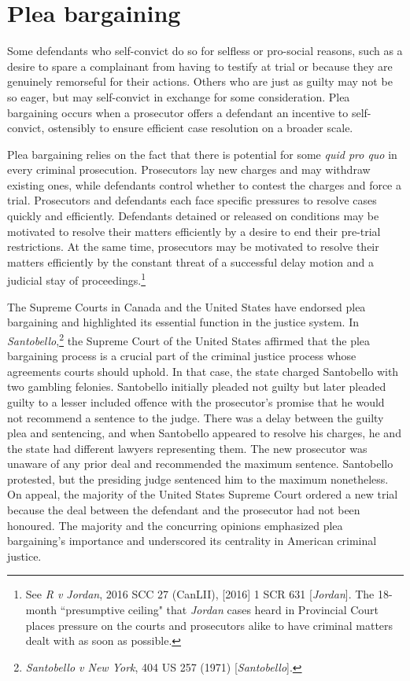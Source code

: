 \section{Plea bargaining}

Some defendants who self-convict do so for selfless or pro-social reasons, such as a desire to spare a complainant from having to testify at trial or because they are genuinely remorseful for their actions. Others who are just as guilty may not be so eager, but may self-convict in exchange for some consideration. Plea bargaining occurs when a prosecutor offers a defendant an incentive to self-convict, ostensibly to ensure efficient case resolution on a broader scale. 

Plea bargaining relies on the fact that there is potential for some \textit{quid pro quo} in every criminal prosecution. Prosecutors lay new charges and may withdraw existing ones, while defendants control whether to contest the charges and force a trial. Prosecutors and defendants each face specific pressures to resolve cases quickly and efficiently. Defendants detained or released on conditions may be motivated to resolve their matters efficiently by a desire to end their pre-trial restrictions. At the same time, prosecutors may be motivated to resolve their matters efficiently by the constant threat of a successful delay motion and a judicial stay of proceedings.\footnote{See \textit{R v Jordan}, 2016 SCC 27 (CanLII), [2016] 1 SCR 631 [\textit{Jordan}]. The 18-month ``presumptive ceiling" that \textit{Jordan} cases heard in Provincial Court places pressure on the courts and prosecutors alike to have criminal matters dealt with as soon as possible.}

The Supreme Courts in Canada and the United States have endorsed plea bargaining and highlighted its essential function in the justice system. In \textit{Santobello},\footnote{\textit{Santobello v New York}, 404 US 257 (1971) [\textit{Santobello}].} the Supreme Court of the United States affirmed that the plea bargaining process is a crucial part of the criminal justice process whose agreements courts should uphold. In that case, the state charged Santobello with two gambling felonies. Santobello initially pleaded not guilty but later pleaded guilty to a lesser included offence with the prosecutor's promise that he would not recommend a sentence to the judge. There was a delay between the guilty plea and sentencing, and when Santobello appeared to resolve his charges, he and the state had different lawyers representing them. The new prosecutor was unaware of any prior deal and recommended the maximum sentence. Santobello protested, but the presiding judge sentenced him to the maximum nonetheless. On appeal, the majority of the United States Supreme Court ordered a new trial because the deal between the defendant and the prosecutor had not been honoured. The majority and the concurring opinions emphasized plea bargaining's importance and underscored its centrality in American criminal justice.

